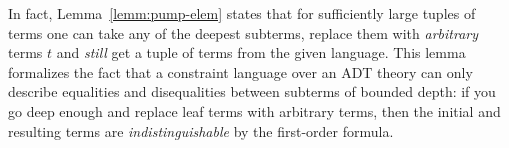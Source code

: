In fact, Lemma~\ref{lemm:pump-elem} states that for sufficiently large tuples of terms one can take any of the deepest subterms, replace them with \emph{arbitrary} terms $ t $ and \emph{still} get a tuple of terms from the given language.
This lemma formalizes the fact that a constraint language over an ADT theory can only describe equalities and disequalities between subterms of bounded depth: if you go deep enough and replace leaf terms with arbitrary terms, then the initial and resulting terms are \emph{indistinguishable} by the first-order formula.

